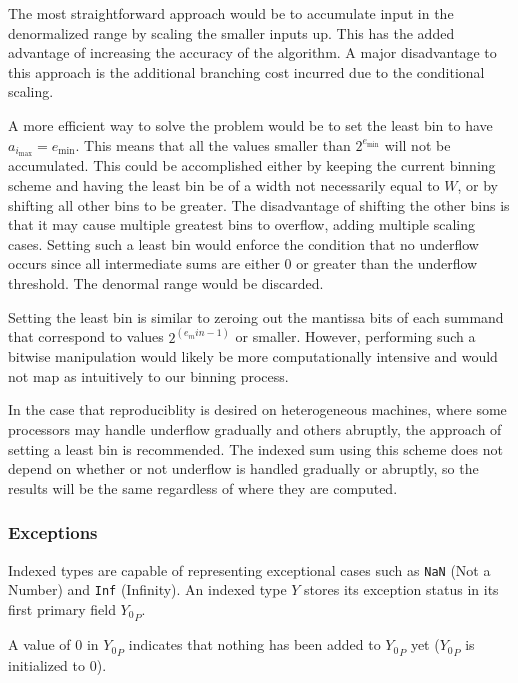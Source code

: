       The most straightforward approach would be to accumulate input in the
      denormalized range by scaling the smaller inputs up. This has the added
      advantage of increasing the accuracy of the algorithm. A major
      disadvantage to this approach is the additional branching cost incurred
      due to the conditional scaling.

      A more efficient way to solve the problem would be to set the least bin
      to have $a_{i_{\max}} = e_{\min}$. This means that all the values smaller
      than $2^{e_{\min}}$ will not be accumulated. 
      This could be accomplished either
      by keeping the current binning scheme and having the least bin be of a
      width not necessarily equal to $W$, or by shifting all other bins to be
      greater. The disadvantage of shifting the other bins is that it may cause
      multiple greatest bins to overflow, adding multiple scaling cases.
      Setting such a least bin would enforce the condition that no underflow
      occurs since all intermediate sums are either $0$ or greater than the
      underflow threshold. The denormal range would be discarded.

      Setting the least bin is similar to zeroing
      out the mantissa bits of each summand
      that correspond to values $2^{(e_min-1)}$ or smaller. However, performing
      such a bitwise manipulation would likely be more computationally intensive
      and would not map as intuitively to our binning process.

      In the case that reproduciblity is desired on heterogeneous machines,
      where some processors may handle underflow gradually and others abruptly,
      the approach of setting a least bin is recommended. The indexed sum using
      this scheme does not depend on whether or not underflow is handled
      gradually or abruptly, so the results will be the same regardless of
      where they are computed.

    \subsubsection{Exceptions}
      \label{sec:indexed_exceptions}
      Indexed types are capable of representing exceptional cases such as
      \texttt{NaN} (Not a Number) and \texttt{Inf} (Infinity). An indexed type
      $Y$ stores its exception status in its first primary field ${Y_0}_P$.

      A value of $0$ in ${Y_0}_P$ indicates that nothing has been added to
      ${Y_0}_P$ yet (${Y_0}_P$ is initialized to $0$).


